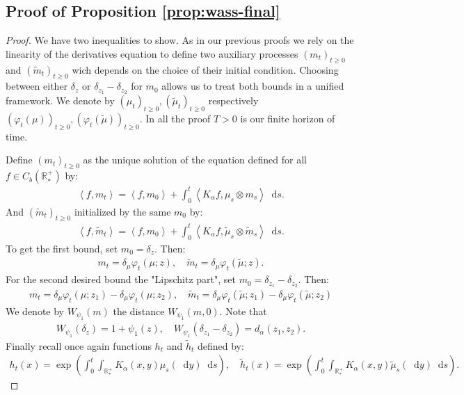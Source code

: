 \documentclass[11pt,a4paper]{article}
\newcommand{\RRP}{\mathbb{R}^+_*}
\newcommand{\Proc}[1]{\left(#1\right)_{t\geq 0}}
\newcommand{\brac}[1]{\left\langle#1\right\rangle}
\newcommand{\dd}{\mathop{}\!\mathrm{d}}
\begin{document}
\subsection{Proof of Proposition \ref{prop:wass-final}} 
\begin{proof}
    We have two inequalities to show. As in our previous proofs we rely on the linearity of the derivatives equation to define two auxiliary processes $\Proc{m_t}$ and $\Proc{\tilde{m}_t}$ wich depends on the choice of their initial condition. Choosing between either $\delta_z$ or $\delta_{z_1}-\delta_{z_2}$ for $m_0$ allows us to treat both bounds in a unified framework. We denote by $\Proc{\mu_t},\Proc{\tilde{\mu}_t}$ respectively $\Proc{\varphi_t(\mu)},\Proc{\varphi_t(\tilde{\mu})}$. In all the proof $T> 0$ is our finite horizon of time.
    
    
    Define $\Proc{m_t}$ as the unique solution of the equation defined for all $f \in C_b(\RRP)$ by:
    \begin{align*}
        \brac{f,m_t} = \brac{f,m_0} + \int_0^t \brac{K_\alpha f,\mu_s\otimes m_s} \dd s.
    \end{align*}
    And $\Proc{\tilde{m}_t}$ initialized by the same $m_0$ by:
    \begin{align*}
        \brac{f,\tilde{m}_t} = \brac{f,m_0} + \int_0^t \brac{K_\alpha f,\tilde{\mu}_s\otimes \tilde{m}_s} \dd s.
    \end{align*}
    To get the first bound, set $m_0 = \delta_z$. Then:
    \begin{align*}
        m_t = \delta_\mu \varphi_t(\mu;z) , \quad \tilde{m}_t = \delta_\mu \varphi_t(\tilde{\mu};z).
    \end{align*}
    For the second desired bound the "Lipschitz part", set $m_0 = \delta_{z_1} - \delta_{z_2}$. Then:
    \begin{align*}
        m_t = \delta_\mu \varphi_t(\mu;z_1) - \delta_\mu \varphi_t(\mu;z_2), \quad \tilde{m}_t = \delta_\mu \varphi_t(\tilde{\mu};z_1) - \delta_\mu \varphi_t(\tilde{\mu};z_2)
    \end{align*}
    We denote by $W_{\psi_1}(m)$ the distance $W_{\psi_1}(m,0)$. Note that 
    \begin{align*}
        W_{\psi_1}(\delta_z) = 1 + \psi_1(z) ,\quad W_{\psi_1}\left( \delta_{z_1} - \delta_{z_2}\right) = d_{\alpha}(z_1,z_2).
    \end{align*}
    Finally recall once again functions $h_t$ and $\tilde{h}_t$ defined by:
    \begin{align*}
        h_t(x) = \exp\left(\int_0^t \int_{\RRP} K_\alpha(x,y) \mu_s(\dd y)\dd s \right), \quad \tilde{h}_t(x) = \exp\left(\int_0^t \int_{\RRP} K_\alpha(x,y) \tilde{\mu}_s(\dd y)\dd s \right).

\end{align*}
\end{proof}
\end{document}
